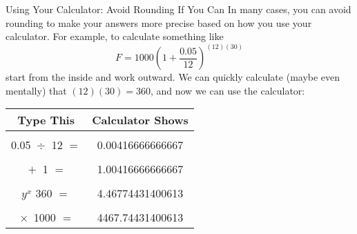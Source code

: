 \begin{proc}{Using Your Calculator: Avoid Rounding If You Can}
In many cases, you can avoid rounding to make your answers more precise based on how you use your calculator.  For example, to calculate something like
\[F = 1000\left(1+\dfrac{0.05}{12}\right)^{(12)(30)}\] start from the inside and work outward.  We can quickly calculate (maybe even mentally) that $(12)(30) = 360$, and now we can use the calculator:
\begin{center}
\begin{tabular}{c | c}
\textbf{Type This} & \textbf{Calculator Shows}\\
\hline
& \\
0.05 $\boxed{\div}$ 12 $\boxed{=}$ & 0.00416666666667\\
& \\
$\boxed{+}$ 1 $\boxed{=}$ & 1.00416666666667\\
& \\
$\boxed{y^x}$ 360 $\boxed{=}$ & 4.46774431400613\\
& \\
$\boxed{\times}$ 1000 $\boxed{=}$ & 4467.74431400613
\end{tabular}
\end{center}
\end{proc}
\pagebreak

